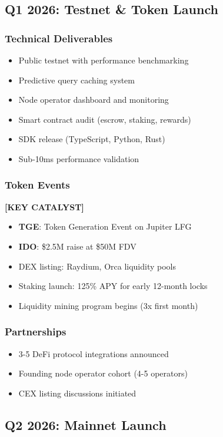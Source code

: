 \documentclass[12pt,a4paper]{article}
\begin{document}
\subsection{Q1 2026: Testnet \& Token Launch}

\subsubsection{Technical Deliverables}
\begin{itemize}
    \item Public testnet with performance benchmarking
    \item Predictive query caching system
    \item Node operator dashboard and monitoring
    \item Smart contract audit (escrow, staking, rewards)
    \item SDK release (TypeScript, Python, Rust)
    \item Sub-10ms performance validation
\end{itemize}

\subsubsection{Token Events} \textbf{[KEY CATALYST]}
\begin{itemize}
    \item \textbf{TGE}: Token Generation Event on Jupiter LFG
    \item \textbf{IDO}: \$2.5M raise at \$50M FDV
    \item DEX listing: Raydium, Orca liquidity pools
    \item Staking launch: 125\% APY for early 12-month locks
    \item Liquidity mining program begins (3x first month)
\end{itemize}

\subsubsection{Partnerships}
\begin{itemize}
    \item 3-5 DeFi protocol integrations announced
    \item Founding node operator cohort (4-5 operators)
    \item CEX listing discussions initiated
\end{itemize}

\subsection{Q2 2026: Mainnet Launch}
\end{document}
